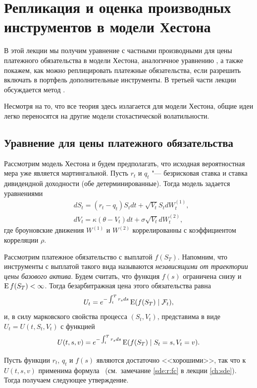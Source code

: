 
\chapter{Репликация и оценка производных инструментов в модели Хестона}
\label{ch:hedging}
\chaptertoc

В этой лекции мы получим уравнение с частными производными для цены платежного обязательства в модели Хестона, аналогичное уравнению \bs, а также покажем, как можно реплицировать платежные обязательства, если разрешить включать в портфель дополнительные инструменты.
В третьей части лекции обсуждается метод \mc.

Несмотря на то, что все теория здесь излагается для модели Хестона, общие идеи легко переносятся на другие модели стохастической волатильности.


\section{Уравнение для цены платежного обязательства}

Рассмотрим модель Хестона и будем предполагать, что исходная вероятностная мера уже является мартингальной.
Пусть $r_t$ и $q_t$ "--- безрисковая ставка и ставка дивидендной доходности (обе детерминированные).
Тогда модель задается уравнениями
\begin{align*}
&d S_t = (r_t-q_t) S_t dt + \sqrt{V_t} S_t dW_t^{(1)},\\
&d V_t = \kappa(\theta-V_t) dt + \sigma \sqrt{V_t} dW_t^{(2)},
\end{align*}
где броуновские движения $W^{(1)}$ и $W^{(2)}$ коррелированны с коэффициентом корреляции $\rho$.

Рассмотрим платежное обязательство с выплатой $f(S_T)$.
Напомним, что инструменты с выплатой такого вида называются \emph{независящими от траектории цены базового актива}. 
Будем считать, что функция $f(s)$ ограничена снизу и $\operatorname{E} f(S_T) < \infty$.
Тогда безарбитражная цена этого обязательства равна
\[
U_t = e^{-\int_t^T r_s ds} \operatorname{E}(f(S_T) \mid \mathcal{F}_t),
\]
и, в силу марковского свойства процесса $(S_t,V_t)$, представима в виде $U_t = U(t,S_t,V_t)$ с функцией 
\[
U(t,s,v) = e^{-\int_t^T r_s ds} \operatorname{E}(f(S_T)\mid S_t=s, V_t=v).
\]

Пусть функции $r_t$, $q_t$ и $f(s)$ являются достаточно <<хорошими>>, так что к $U(t,s,v)$ применима формула \fc\ (см.~замечание \ref{sde:r:fc} в лекции \ref{ch:sde}).
Тогда получаем следующее утверждение.

